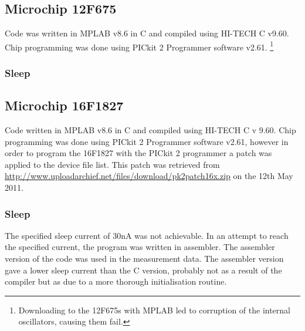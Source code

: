 


\subsection*{Microchip 12F675}

Code was written in MPLAB v8.6 in C and compiled using HI-TECH C v9.60.
Chip programming was done using PICkit 2 Programmer software v2.61.
\footnote{Downloading to the 12F675s with MPLAB led to corruption of the internal
oscillators, causing them fail.%
}


\subsubsection*{Sleep}


\subsection*{Microchip 16F1827}

Code written in MPLAB v8.6 in C and compiled using HI-TECH C v 9.60.
Chip programming was done using PICkit 2 Programmer software v2.61,
however in order to program the 16F1827 with the PICkit 2 programmer
a patch was applied to the device file list. This patch was retrieved
from \url{http://www.uploadarchief.net/files/download/pk2patch16x.zip}
on the 12th May 2011.


\subsubsection*{Sleep}

The specified sleep current of 30nA was not achievable. In an attempt
to reach the specified current, the program was written in assembler.
The assembler version of the code was used in the measurement data.
The assembler version gave a lower sleep current than the C version,
probably not as a result of the compiler but as due to a more thorough
initialisation routine.






